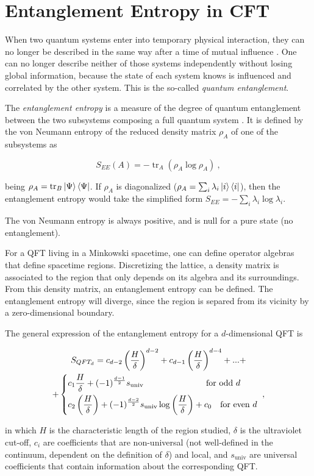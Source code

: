 \documentclass[twocolumn]{revtex4}
\providecommand{\eq}[2]{
    \begin{equation}
        #2
    \label{eq:#1}
    \end{equation}
}
\providecommand{\eqgat}[2]{
    \begin{gather}
        #2
    \label{eq:#1}
    \end{gather}
}
\DeclareMathOperator{\tr}{tr}
\begin{document}
\section{Entanglement Entropy in CFT} \label{s:EE_CFT}

When two quantum systems enter into temporary physical interaction, they can no longer be described in the same way after a time of mutual influence \cite{schrodinger_discussion_1935}. One can no longer describe neither of those systems independently without losing global information, because the state of each system knows is influenced and correlated by the other system. This is the so-called \textit{quantum entanglement}.

The \textit{entanglement entropy} is a measure of the degree of quantum entanglement between the two subsystems composing a full quantum system \cite{nishioka_entanglement_2018}. It is defined by the von Neumann entropy of the reduced density matrix $\rho_A$ of one of the subsystems as
\eq{EE}{
    S_{EE}(A) = - \tr_A ( \rho_A \log \rho_A ) \ ,
}
being $\rho_A = \tr_B \ket{\Psi}\bra{\Psi}$. If $\rho_A$ is diagonalized ($\rho_A = \sum_i \lambda_i \ket{i}\bra{i}$), then the entanglement entropy would take the simplified form $S_{EE} = - \sum_i \lambda_i \log \lambda_i$.

The von Neumann entropy is always positive, and is null for a pure state (no entanglement).

For a QFT living in a Minkowski spacetime, one can define operator algebras that define spacetime regions. Discretizing the lattice, a density matrix is associated to the region that only depends on its algebra and its surroundings. From this density matrix, an entanglement entropy can be defined. The entanglement entropy will diverge, since the region is separed from its vicinity by a zero-dimensional boundary.

The general expression of the entanglement entropy for a $d$-dimensional QFT is
\eqgat{EE}{
    S_{QFT_d} = c_{d-2} \left( \frac{H}{\delta} \right) ^{d-2} + c_{d-1} \left( \frac{H}{\delta} \right) ^{d-4} + ... + \nonumber \\
    + \begin{dcases}
        c_1 \frac{H}{\delta} + (-1)^{\frac{d-1}{2}} s_{\text{univ}}
        \qquad \qquad \qquad \quad \ \text{for odd } d \\
        c_2 \left ( \frac{H}{\delta} \right ) + (-1)^{\frac{d-2}{2}} s_{\text{univ}} \log \left ( \frac{H}{\delta} \right ) + c_0
        \quad \text{for even } d
    \end{dcases} \ ,
}
\cite{nishioka_entanglement_2018} in which $H$ is the characteristic length of the region studied, $\delta$ is the ultraviolet cut-off, $c_i$ are coefficients that are non-universal (not well-defined in the continuum, dependent on the definition of $\delta$) and local, and $s_{\text{univ}}$ are universal coefficients that contain information about the corresponding QFT.
\end{document}
